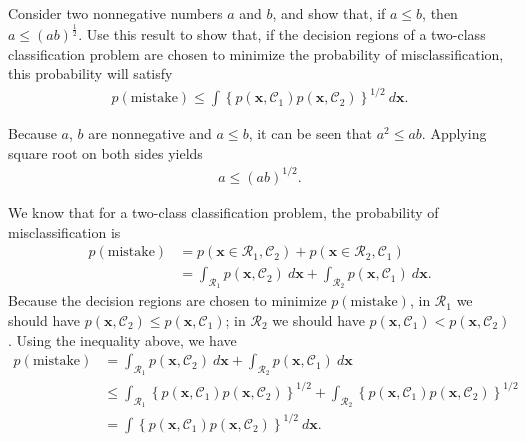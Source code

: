 \begin{question}{1.21}
	Consider two nonnegative numbers $a$ and $b$, and show that, if $a \leq b$, then $a \leq (ab)^{\frac{1}{2}}$. Use this result to show that, if the decision regions of a two-class classification problem are chosen to minimize the probability of misclassification, this probability will satisfy
	\begin{align*}
		p(\mbox{mistake}) \leq \int \left\{ p(\bm{x}, \mathcal{C}_1)p(\bm{x}, \mathcal{C}_2) \right\}^{1/2}\ d\bm{x}.
	\end{align*}
\end{question}

\begin{answer}{}
	Because $a$, $b$ are nonnegative and $a \leq b$, it can be seen that $a^2 \leq ab$. Applying square root on both sides yields
	\begin{align}
		a \leq (ab)^{1/2}.
	\end{align}
	
	We know that for a two-class classification problem, the probability of misclassification is
	\begin{align}
		p(\mbox{mistake}) &= p(\bm{x} \in \mathcal{R}_1, \mathcal{C}_2) + p(\bm{x} \in \mathcal{R}_2, \mathcal{C}_1)\\
		&= \int_{\mathcal{R}_1} p(\bm{x}, \mathcal{C}_2)\ d\bm{x} + \int_{\mathcal{R}_2} p(\bm{x}, \mathcal{C}_1)\ d\bm{x}.
	\end{align}
	Because the decision regions are chosen to minimize $p(\mbox{mistake})$, in $\mathcal{R}_1$ we should have $p(\bm{x}, \mathcal{C}_2) \leq p(\bm{x}, \mathcal{C}_1) $; in $\mathcal{R}_2$ we should have $p(\bm{x}, \mathcal{C}_1) < p(\bm{x}, \mathcal{C}_2)$. Using the inequality above, we have
	\begin{align}
		p(\mbox{mistake}) & = \int_{\mathcal{R}_1} p(\bm{x}, \mathcal{C}_2)\ d\bm{x} + \int_{\mathcal{R}_2} p(\bm{x}, \mathcal{C}_1)\ d\bm{x}\\
		&\leq \int_{\mathcal{R}_1} \left\{ p(\bm{x}, \mathcal{C}_1)p(\bm{x}, \mathcal{C}_2) \right\}^{1/2} + \int_{\mathcal{R}_2} \left\{ p(\bm{x}, \mathcal{C}_1)p(\bm{x}, \mathcal{C}_2) \right\}^{1/2}\\
		&= \int \left\{ p(\bm{x}, \mathcal{C}_1)p(\bm{x}, \mathcal{C}_2) \right\}^{1/2}\ d\bm{x}.
	\end{align}
\end{answer}